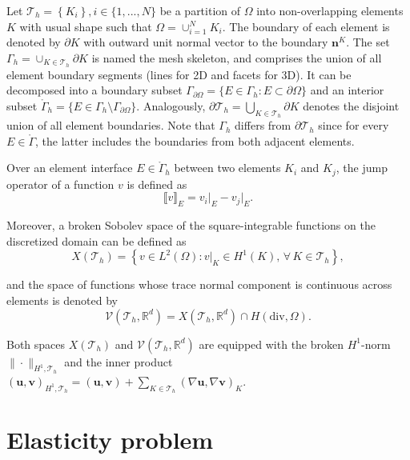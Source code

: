 \documentclass[english,11pt,3p,number,sort&compress]{elsarticle}
\newcommand{\jump}[1]
{
	\llbracket #1 \rrbracket
}
\begin{document}
Let $\mathcal{T}_h=\left\{K_i \right\}, i\in \{1,...,N\}$ be a partition of $\Omega$ into non-overlapping elements $K$ with usual shape such that $\Omega = \cup_{i=1}^{N} K_i$. The boundary of each element is denoted by $\partial K$ with outward unit normal vector to the boundary $\bm{n}^K$. The set $\Gamma_h=\cup_{K \in \mathcal{T}_h} \partial K$ is named the mesh skeleton, and comprises the union of all element boundary segments (lines for 2D and facets for 3D). It can be decomposed into a boundary subset $\Gamma_{\partial\Omega}=\{E \in \Gamma_h : E \subset \partial\Omega\}$ and an interior subset $\mathring{\Gamma}_h =\{E \in \Gamma_h \setminus \Gamma_{\partial\Omega}\}$. Analogously, $\partial\mathcal{T}_h=\bigcup_{K \in \mathcal{T}_h} \partial K$ denotes the disjoint union of all element boundaries. Note that $\Gamma_h$ differs from $\partial\mathcal{T}_h$ since for every $E \in \mathring{\Gamma}$, the latter includes the boundaries from both adjacent elements.

Over an element interface $E \in \mathring{\Gamma}_h$ between two elements $K_i$ and $K_j$, the jump operator of a function $v$ is defined as
\begin{equation*}
	\jump{v}_E = v_i \lvert_{E} - v_j \lvert_{E} \text{.}
\end{equation*}

Moreover, a broken Sobolev space of the square-integrable functions on the discretized domain can be defined as
\begin{equation*}
	X(\mathcal{T}_h) = \left\{v \in L^2(\Omega) : v \lvert_{K} \in H^1(K), \,\forall \, K\in\mathcal{T}_h \right\} ,
\end{equation*}

\noindent and the space of functions whose trace normal component is continuous across elements is denoted by
\begin{equation*}
	\mathcal{V}(\mathcal{T}_h,\mathbb{R}^d) = X(\mathcal{T}_h,\mathbb{R}^d) \cap H(\text{div},\Omega) .
\end{equation*}

\noindent Both spaces $X(\mathcal{T}_h)$ and $\mathcal{V}(\mathcal{T}_h,\mathbb{R}^d)$ are equipped with the broken $H^1$-norm $\| \cdot \|_{H^1,\mathcal{T}_h}$ and the inner product $(\bm{u},\bm{v})_{H^1,\mathcal{T}_h}=(\bm{u},\bm{v})+\sum_{K \in \mathcal{T}_h}(\nabla\bm{u},\nabla\bm{v})_K$.

\section{Elasticity problem \label{sec:Governing-equations}}
\end{document}
